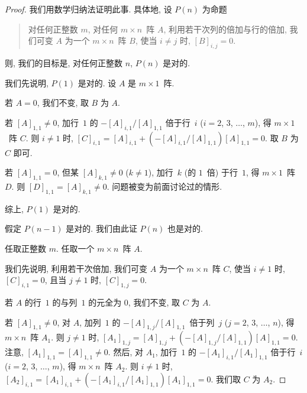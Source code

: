 \documentclass[../libro.tex]{subfiles}
\begin{document}
\begin{proof}
    我们用数学归纳法证明此事.
    具体地, 设 \(P(n)\) 为命题
    \begin{quotation}
        对任何正整数 \(m\),
        对任何 \(m \times n\)~阵 \(A\),
        利用若干次列的倍加与行的倍加,
        我们可变 \(A\) 为一个 \(m \times n\)~阵 \(B\),
        使当 \(i \neq j\) 时,
        \([B]_{i,j} = 0\).
    \end{quotation}
    则, 我们的目标是,
    对任何正整数 \(n\), \(P(n)\) 是对的.

    我们先说明, \(P(1)\) 是对的.
    设 \(A\) 是 \(m \times 1\)~阵.

    若 \(A = 0\), 我们不变, 取 \(B\) 为 \(A\).

    若 \([A]_{1,1} \neq 0\),
    加行~\(1\) 的 \(-[A]_{i,1}/[A]_{1,1}\) 倍于行~\(i\)
    (\(i = 2\), \(3\), \(\dots\), \(m\)),
    得 \(m \times 1\)~阵 \(C\).
    则 \(i \neq 1\) 时,
    \([C]_{i,1}
        = [A]_{i,1} + (-[A]_{i,1}/[A]_{1,1}) [A]_{1,1}
    = 0\).
    取 \(B\) 为 \(C\) 即可.

    若 \([A]_{1,1} = 0\), 但某 \([A]_{k,1} \neq 0\)
    (\(k \neq 1\)),
    加行~\(k\) (的 \(1\)~倍) 于行~\(1\),
    得 \(m \times 1\)~阵 \(D\).
    则 \([D]_{1,1} = [A]_{k,1} \neq 0\).
    问题被变为前面讨论过的情形.

    综上, \(P(1)\) 是对的.

    假定 \(P(n-1)\) 是对的.
    我们由此证 \(P(n)\) 也是对的.

    任取正整数 \(m\).
    任取一个 \(m \times n\)~阵 \(A\).

    我们先说明, 利用若干次倍加,
    我们可变 \(A\) 为一个 \(m \times n\)~阵 \(C\),
    使当 \(i \neq 1\) 时, \([C]_{i,1} = 0\),
    且当 \(j \neq 1\) 时, \([C]_{1,j} = 0\).

    若 \(A\) 的行~\(1\) 的与列~\(1\) 的元全为 \(0\),
    我们不变, 取 \(C\) 为 \(A\).

    若 \([A]_{1,1} \neq 0\),
    对 \(A\), 加列~\(1\) 的
    \(-[A]_{1,j} / [A]_{1,1}\)~倍于列~\(j\)
    (\(j = 2\), \(3\), \(\dots\), \(n\)),
    得 \(m \times n\)~阵 \(A_1\).
    则 \(j \neq 1\) 时,
    \([A_1]_{1,j}
        = [A]_{1,j} + (-[A]_{1,j}/[A]_{1,1}) [A]_{1,1}
    = 0\).
    注意, \([A_1]_{1,1} = [A]_{1,1} \neq 0\).
    然后, 对 \(A_1\), 加行~\(1\) 的
    \(-[A_1]_{i,1}/[A_1]_{1,1}\) 倍于行~\(i\)
    (\(i = 2\), \(3\), \(\dots\), \(m\)),
    得 \(m \times n\)~阵 \(A_2\).
    则 \(i \neq 1\) 时,
    \([A_2]_{i,1}
        = [A_1]_{i,1} + (-[A_1]_{i,1}/[A_1]_{1,1}) [A_1]_{1,1}
    = 0\).
    我们取 \(C\) 为 \(A_2\).


\end{proof}
\end{document}
